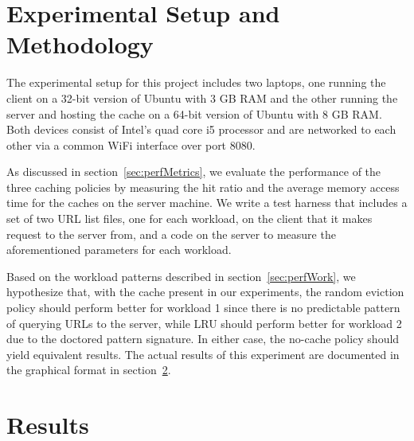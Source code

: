 \documentclass[11pt,pdftex,twocolumn]{article}
\begin{document}
\section{Experimental Setup and Methodology}
\label{sec:exp}
The experimental setup for this project includes two laptops, one running the client on a 32-bit version of Ubuntu with 3 GB RAM and the other running the server and hosting the cache on a 64-bit version of Ubuntu with 8 GB RAM. Both devices consist of Intel's quad core i5 processor and are networked to each other via a common WiFi interface over port 8080.

As discussed in section~\ref{sec:perfMetrics}, we evaluate the performance of the three caching policies by measuring the hit ratio and the average memory access time for the caches on the server machine. We write a test harness that includes a set of two URL list files, one for each workload, on the client that it makes request to the server from, and a code on the server to measure the aforementioned parameters for each workload.

Based on the workload patterns described in section~\ref{sec:perfWork}, we hypothesize that, with the cache present in our experiments, the random eviction policy should perform better for workload 1 since there is no predictable pattern of querying URLs to the server, while LRU should perform better for workload 2 due to the doctored pattern signature. In either case, the no-cache policy should yield equivalent results. The actual results of this experiment are documented in the graphical format in section~\ref{sec:results}.

\section{Results}
\label{sec:results}
\lipsum[1]
\end{document}

